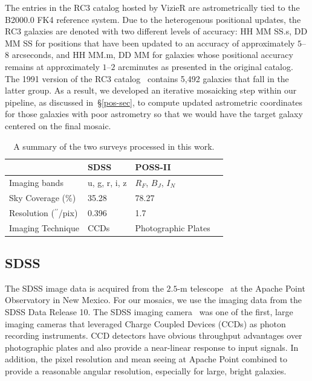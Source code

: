 \documentclass[authoryear, 12pt, 5p, times]{elsarticle}
\begin{document}
The entries in the RC3 catalog hosted by VizieR are astrometrically tied to the B2000.0 FK4 reference system. Due to the heterogenous positional updates, the RC3 galaxies are denoted with two different levels of accuracy: HH MM SS.s, DD MM SS for positions that have been updated  to an accuracy of approximately $5$--$8$ arcseconds, and  HH MM.m, DD MM for galaxies whose positional accuracy remains at approximately $1$--$2$ arcminutes as presented in the original catalog. The 1991 version of the RC3 catalog~\citep{rc31991} contains 5,492  galaxies that fall in the latter group. As a result, we developed an iterative mosaicking step within our pipeline, as discussed in~\S\ref{pos-sec}, to compute updated astrometric coordinates for those galaxies with poor astrometry so that we would have the target galaxy centered on the final mosaic.

\begin{table}
\footnotesize
    \begin{tabular}{llll}
    \hline
    ~                           & SDSS    & POSS-II             \\ \hline
    Imaging bands               & u, g, r, i, z  & $R_F$, $B_J$, $I_N$             \\
    Sky Coverage (\%)                & 35.28 & 78.27             \\
    Resolution ($^{\prime\prime}$/pix) & 0.396  & 1.7                 \\
    Imaging Technique           & CCDs    & Photographic Plates\\ \hline
    \end{tabular}
    \label{table:comptbl}
    \caption{{\footnotesize A summary of the two surveys processed in this work.}}
\end{table}

\subsection{SDSS}
The SDSS image data is acquired from the $2.5$-m telescope~\citep{sdss-tel} at the Apache Point Observatory in New Mexico. For our mosaics, we use the imaging data from the SDSS Data Release 10. The SDSS imaging camera~\citep{sdss-camera} was one of the first, large imaging cameras that leveraged Charge Coupled Devices (CCDs) as photon recording instruments. CCD detectors have obvious throughput advantages over photographic plates and also provide a near-linear response to input signals. In addition, the pixel resolution and mean seeing at Apache Point combined to provide a reasonable angular resolution, especially for large, bright galaxies. 
\end{document}

